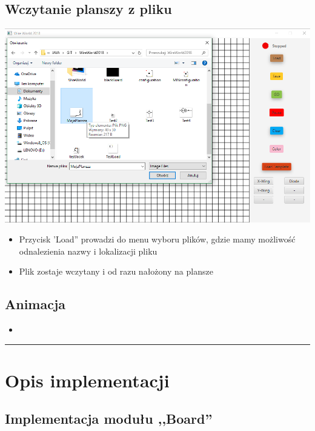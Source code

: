 \documentclass[a4paper,11pt]{article}
\newcommand{\linia}{\rule{\linewidth}{0.4mm}}
\begin{document}
\subsection{Wczytanie planszy z pliku}
\includegraphics[width=\textwidth]{load}
\begin{itemize}
\item Przycisk 'Load'' prowadzi do menu wyboru plików, gdzie mamy możliwość odnalezienia nazwy i lokalizacji pliku
\item Plik zostaje wczytany i  od razu nałożony na plansze


\end{itemize}
\subsection{Animacja}
\begin{itemize}
\item 
\end{itemize}

\noindent\linia
\section{Opis implementacji}

\subsection{Implementacja modułu ,,Board''}
\end{document}
